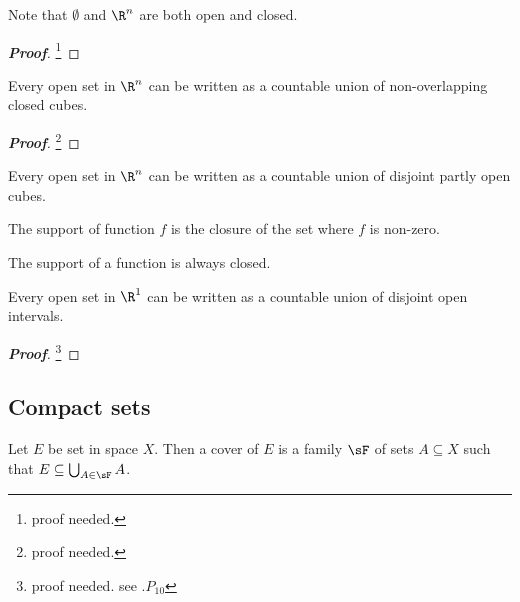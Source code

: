 \begin{proposition}
Note that $\emptyset$ and $\R^n$ are both open and closed.
\end{proposition}

\begin{proof}[\bf Proof]
\footnote{proof needed.}
\end{proof}

\begin{theorem}\label{thm:open_set_real_n_can_be_countable_union_of_non_overlapping_closed_cubes}
Every open set in $\R^n$ can be written as a countable union of non-overlapping closed cubes.
\end{theorem}

\begin{proof}[\bf Proof]
\footnote{proof needed.}
\end{proof}

\begin{theorem}
Every open set in $\R^n$ can be written as a countable union of disjoint partly open cubes.
\end{theorem}

\begin{definition}
The support of function $f$ is the closure of the set where $f$ is non-zero.
\end{definition}

\begin{remark}
The support of a function is always closed.
\end{remark}

\begin{theorem}
Every open set in $\R^1$ can be written as a countable union of disjoint open intervals.
\end{theorem}

\begin{proof}[\bf Proof]
\footnote{proof needed. see \cite{Wheeden_Zygmund_2015}.$P_{10}$}
\end{proof}




\subsection{Compact sets}


\begin{definition}
Let $E$ be set in space $X$. Then a cover of $E$ is a family $\sF$ of sets $A\subseteq X$ such that $E\subseteq\bigcup_{A\in \sF} A$.
\end{definition}

